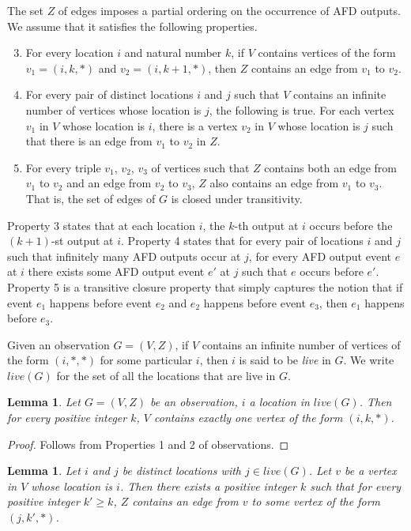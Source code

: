 \documentclass[11pt]{article}
\numberwithin{theorem}{section}
\newtheorem{lemma}[theorem]{Lemma}
\begin{document}
The set $Z$ of edges imposes a partial ordering on the occurrence of
AFD outputs.  We assume that it satisfies the following properties.
\begin{enumerate}
\setcounter{enumi}{2}
\item 
For every location $i$ and natural number $k$, if $V$ contains
vertices of the form $v_1 = (i,k,*)$ and $v_2 = (i,k+1,*)$, then $Z$
contains an edge from $v_1$ to $v_2$. 
\item 
For every pair of distinct locations $i$ and $j$ such that $V$
contains an infinite number of vertices whose location is $j$, the
following is true. 
For each vertex $v_1$ in $V$ whose location is $i$, there is a vertex
$v_2$ in $V$ whose location is $j$ such that there is an edge from
$v_1$ to $v_2$ in $Z$.
\item 
For every triple $v_1$, $v_2$, $v_3$ of vertices such that $Z$
contains both an edge from $v_1$ to $v_2$ and an edge from $v_2$ to
$v_3$, $Z$ also contains an edge from $v_1$ to $v_3$. 
That is, the set of edges of $G$ is closed under transitivity.
\end{enumerate}
Property 3 states that at each location $i$, the $k$-th output at $i$ occurs before the
$(k+1)$-st output at $i$. 
Property 4 states that for every pair of locations $i$ and $j$ such that infinitely many AFD outputs occur at $j$, for every AFD output event $e$ at $i$ there exists some AFD output event $e'$ at $j$ such that $e$ occurs before
$e'$. 
Property 5 is a transitive closure property that simply captures the
notion that if event $e_1$ happens before event $e_2$ and $e_2$
happens before event $e_3$, then $e_1$ happens before $e_3$.

Given an observation $G = (V,Z)$, if $V$ contains an infinite number
of vertices of the form $(i,*,*)$ for some particular $i$, then $i$ is
said to be \emph{live} in $G$. 
We write $live(G)$ for the set of all the locations that are live in $G$.

\begin{lemma}
\label{prop:liveImpliesAllIndices}
Let $G = (V,Z)$ be an observation, $i$ a location in $live(G)$.
Then for every positive integer $k$, $V$ contains exactly one vertex
of the form $(i,k,*)$.
\end{lemma}
\begin{proof}
Follows from Properties 1 and 2 of observations.
\end{proof}

\begin{lemma}
\label{prop:outgoingEdgesToLiveVertices}
Let $i$ and $j$ be distinct locations with $j \in live(G)$.
Let $v$ be a vertex in $V$ whose location is $i$.
Then there exists a positive integer $k$ such that for every positive
integer $k' \geq k$, $Z$ contains an edge from $v$ to some vertex of
the form $(j,k',*)$.
\end{lemma}
\end{document}
